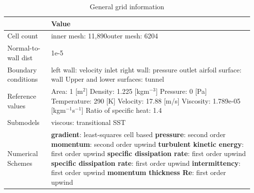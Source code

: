 \begin{enumerate}
\begin{table}[H]
\caption{General grid information}
	\centering
	\begin{tabular}{|l|p{4.5in}|} \hline
				 & Value \\ \hline \hline
		Cell count & inner mesh: 11,890\newline outer mesh: 6204 \\ \hline
		Normal-to-wall dist & 1e-5 \\ \hline
		Boundary conditions & left wall: velocity inlet \newline right wall: pressure outlet \newline airfoil surface: wall \newline Upper and lower surfaces: tunnel \\ \hline
		Reference values & Area: 1 [m$^2$] \newline Density: 1.225 [kgm$^{-3}$] \newline Pressure: 0 [Pa] \newline Temperature: 290 [K] \newline Velocity: 17.88 [m/s] \newline Viscosity: 1.789e-05 [kgm$^{-1}$s$^{-1}$] \newline Ratio of specific heat: 1.4 \\ \hline
		Submodels & viscous: transitional SST \\ \hline
		Numerical Schemes & \textbf{gradient}: least-squares cell based \newline \textbf{pressure}: second order \newline \textbf{momentum}: second order upwind \newline \textbf{turbulent kinetic energy}: first order upwind \newline \textbf{specific dissipation rate}: first order upwind \newline \textbf{specific dissipation rate}: first order upwind \newline \textbf{intermittency}: first order upwind \newline \textbf{momentum thickness Re}: first order upwind \\ \hline
	\end{tabular}
\end{table}



		
\end{enumerate}